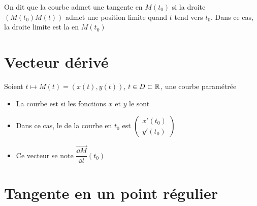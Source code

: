 \begin{frame}
\begin{mydefinition}
On dit que la courbe admet une tangente en $M(t_0)$ si la droite $(M(t_0)M(t))$ 
admet une position limite quand $t$ tend vers $t_0$. Dans ce cas, 
la droite limite est la  en $M(t_0)$ 
\end{mydefinition}


\end{frame}



\section{Vecteur dérivé}

\begin{frame}
Soient $t\mapsto M(t)=(x(t),y(t))$, $t\in D\subset\mathbb{R}$, une courbe paramétrée 
\pause
\begin{mydefinition}
\begin{itemize}
  \item La courbe est  si les fonctions 
$x$ et $y$ le sont
  \pause
  \item Dans ce cas, le  de la courbe en $t_0$ est 
$\left(
\begin{array}{c}
x'(t_0)\\
y'(t_0)
\end{array}
\right)$
  \pause
  \item Ce vecteur se note $\overrightarrow{\dfrac{\dd M}{\dd t}}(t_0)$
\end{itemize}

\end{mydefinition}

\pause


\end{frame}


\section{Tangente en un point régulier}

